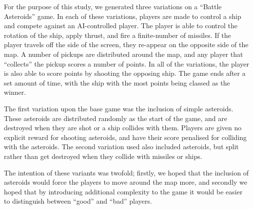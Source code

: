 For the purpose of this study, we generated three variations on a “Battle Asteroids” game. In each of these variations, players are made to control a ship and compete against an AI-controlled player. The player is able to control the rotation of the ship, apply thrust, and fire a finite-number of missiles. If the player travels off the side of the screen, they re-appear on the opposite side of the map. A number of pickups are distributed around the map, and any player that “collects” the pickup scores a number of points. In all of the variations, the player is also able to score points by shooting the opposing ship. The game ends after a set amount of time, with the ship with the most points being classed as the winner.

The first variation upon the base game was the inclusion of simple asteroids. These asteroids are distributed randomly as the start of the game, and are destroyed when they are shot or a ship collides with them. Players are given no explicit reward for shooting asteroids, and have their score penalised for colliding with the asteroids. The second variation used also included asteroids, but split rather than get destroyed when they collide with missiles or ships.

The intention of these variants was twofold; firstly, we hoped that the inclusion of asteroids would force the players to move around the map more, and secondly we hoped that by introducing additional complexity to the game it would be easier to distinguish between “good” and “bad” players.

